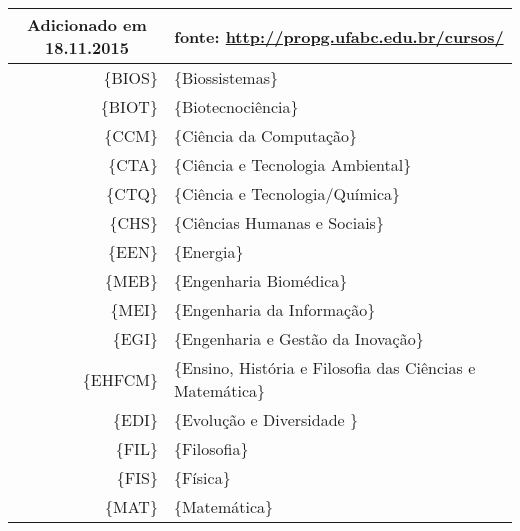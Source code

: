 \begin{table}[H]
\begin{tabular}{r|l}
		\multicolumn{1}{c}{Adicionado em 18.11.2015} & \multicolumn{1}{c}{fonte: \url{http://propg.ufabc.edu.br/cursos/}} \\\hline
		\{BIOS\}                                             & \{Biossistemas\}                                                     \\
		\{BIOT\}                                             & \{Biotecnociência\}                                                  \\
		\{CCM\}                                              & \{Ciência da Computação\}                                            \\
		\{CTA\}                                              & \{Ciência e Tecnologia Ambiental\}                                   \\
		\{CTQ\}                                              & \{Ciência e Tecnologia/Química\}                                     \\
		\{CHS\}                                              & \{Ciências Humanas e Sociais\}                                       \\
		\{EEN\}                                              & \{Energia\}                                                          \\
		\{MEB\}                                              & \{Engenharia Biomédica\}                                             \\
		\{MEI\}                                              & \{Engenharia da Informação\}                                         \\
		\{EGI\}                                              & \{Engenharia e Gestão da Inovação\}                                  \\
		\{EHFCM\}                                            & \{Ensino, História e Filosofia das Ciências e Matemática\}           \\
		\{EDI\}                                              & \{Evolução e Diversidade \}                                          \\
		\{FIL\}                                              & \{Filosofia\}                                                        \\
		\{FIS\}                                              & \{Física\}                                                           \\
		\{MAT\}                                              & \{Matemática\}                                                       \\

\end{tabular}
\end{table}

